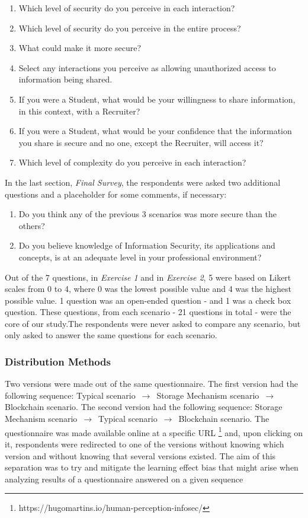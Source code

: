 \begin{enumerate}
	\item Which level of security do you perceive in each interaction?
	\item Which level of security do you perceive in the entire process?
	\item What could make it more secure?
	\item Select any interactions you perceive as allowing unauthorized access to information being shared.
	\item If you were a Student, what would be your willingness to share information, in this context, with a Recruiter?
	\item  If you were a Student, what would be your confidence that the information you share is secure and no one, except the Recruiter, will access it?
	\item Which level of complexity do you perceive in each interaction?
\end{enumerate}

In the last section, \textit{Final Survey}, the respondents were asked two additional questions and a placeholder for some comments, if necessary:

\begin{enumerate}
	\item Do you think any of the previous 3 scenarios was more secure than the others?
	\item Do you believe knowledge of Information Security, its applications and concepts, is at an adequate level in your professional environment?
\end{enumerate}

Out of the 7 questions, in \textit{Exercise 1} and in \textit{Exercise 2}, 5 were based on Likert scales from 0 to 4, where 0 was the lowest possible value and 4 was the highest possible value. 1 question was an open-ended question - and 1 was a check box question. These questions, from each scenario - 21 questions in total - were the core of our study.The respondents were never asked to compare any scenario, but only asked to answer the same questions for each scenario.

\subsubsection{Distribution Methods}

Two versions were made out of the same questionnaire. The first version had the following sequence: Typical scenario $\,\to\,$ Storage Mechanism scenario $\,\to\,$ Blockchain scenario. The second version had the following sequence: Storage Mechanism scenario $\,\to\,$ Typical scenario $\,\to\,$ Blockchain scenario. The questionnaire was made available online at a specific URL \footnote{https://hugomartins.io/human-perception-infosec/} and, upon clicking on it, respondents were redirected to one of the versions without knowing which version and without knowing that several versions existed. The aim of this separation was to try and mitigate the learning effect bias that might arise when analyzing results of a questionnaire answered on a given sequence

